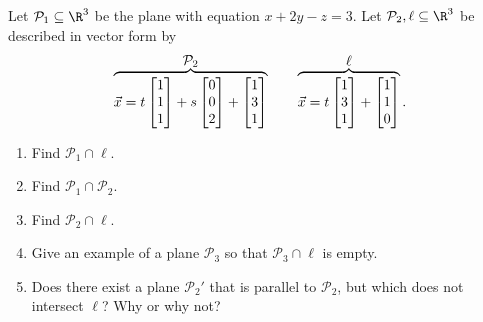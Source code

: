 \begin{exercises}
\begin{problist}
		\prob Let $\mathcal P_1\subseteq\R^3$ be the plane with equation $x+2y-z=3$. Let
		$\mathcal P_2,\ell\subseteq\R^3$ be described in vector form by
		\[
			\overbrace{\vec x=t\mat{1\\1\\1}+s\mat{0\\0\\2}+\mat{1\\3\\1}}^{\displaystyle \mathcal P_2}
			\qquad
			\overbrace{\vec x=t\mat{1\\3\\1}+\mat{1\\1\\0}}^{\displaystyle \ell}.
		\]
		\begin{enumerate}
			\item Find $\mathcal P_1\cap \ell$.
			\item Find $\mathcal P_1\cap \mathcal P_2$.
			\item Find $\mathcal P_2\cap \ell$.
			\item Give an example of a plane $\mathcal P_3$ so that
				$\mathcal P_3\cap\ell$ is empty.
			\item Does there exist a plane $\mathcal P_2'$ that is 
				parallel to $\mathcal P_2$, but which does not
				intersect $\ell$? Why or why not?
		\end{enumerate}


\end{problist}
\end{exercises}
